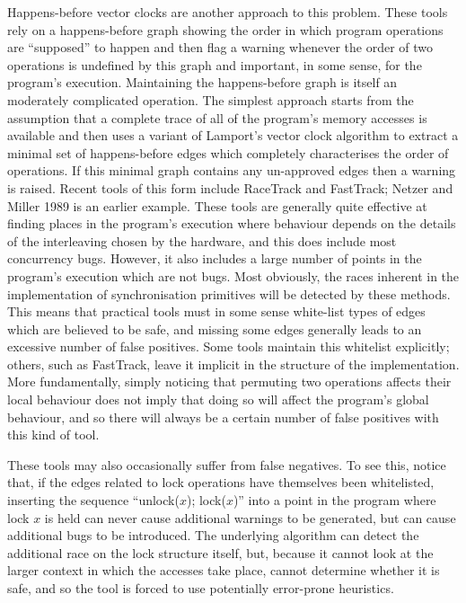 Happens-before vector clocks are another approach to this problem.
These tools rely on a happens-before graph showing the order in which
program operations are ``supposed'' to happen and then flag a warning
whenever the order of two operations is undefined by this graph and
important, in some sense, for the program's execution.  Maintaining
the happens-before graph is itself an moderately complicated
operation.  The simplest approach starts from the assumption that a
complete trace of all of the program's memory accesses is available
and then uses a variant of Lamport's vector clock algorithm\needCite{}
to extract a minimal set of happens-before edges which completely
characterises the order of operations.  If this minimal graph contains
any un-approved edges then a warning is raised.  Recent tools
of this form include RaceTrack\needCite{} and FastTrack\needCite{};
Netzer and Miller 1989 is an earlier example.  These tools are
generally quite effective at finding places in the program's execution
where behaviour depends on the details of the interleaving chosen by
the hardware, and this does include most concurrency bugs.  However,
it also includes a large number of points in the program's execution
which are not bugs.  Most obviously, the races inherent in the
implementation of synchronisation primitives will be detected by these
methods.  This means that practical tools must in some sense
white-list types of edges which are believed to be safe, and missing
some edges generally leads to an excessive number of false positives.
Some tools maintain this whitelist explicitly\needCite{}; others, such
as FastTrack, leave it implicit in the structure of the
implementation.  More fundamentally, simply noticing that permuting
two operations affects their local behaviour does not imply that doing
so will affect the program's global behaviour, and so there will
always be a certain number of false positives with this kind of tool.

These tools may also occasionally suffer from false negatives.  To see
this, notice that, if the edges related to lock operations have
themselves been whitelisted, inserting the sequence ``unlock($x$);
lock($x$)'' into a point in the program where lock $x$ is held can
never cause additional warnings to be generated, but can cause
additional bugs to be introduced.  The underlying algorithm can detect
the additional race on the lock structure itself, but, because it
cannot look at the larger context in which the accesses take place,
cannot determine whether it is safe, and so the tool is forced to use
potentially error-prone heuristics.

